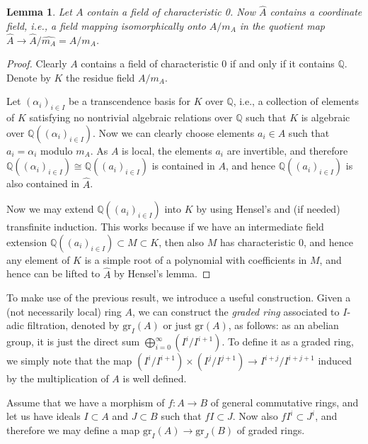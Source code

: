 \documentclass[12pt,a4paper,leqno]{article}
\newcommand{\Q}{\mathbb{Q}}
\newcommand{\gr}{\mathrm{gr}}
\theoremstyle{plain}
\newtheorem{lem}[theo]{Lemma}
\theoremstyle{definition}
\theoremstyle{remark}
\begin{document}
\begin{lem}
Let $A$ contain a field of characteristic 0. Now $\widehat A$ contains a coordinate field, i.e., a field mapping isomorphically onto $ A/ m_A$ in the quotient map $\widehat A \to \widehat A/ \widehat {m_A} = A / m_A$.
\end{lem}
\begin{proof}
Clearly $A$ contains a field of characteristic 0 if and only if it contains $\Q$. Denote by $K$ the residue field $A/m_A$. 

Let $(\alpha_i)_{i \in I}$ be a transcendence basis for $K$ over $\Q$, i.e., a collection of elements of $K$ satisfying no nontrivial algebraic relations over $\Q$ such that $K$ is algebraic over $\Q((\alpha_i)_{i \in I})$. Now we can clearly choose elements $a_i \in A$ such that $a_i = \alpha_i$ modulo $m_A$. As $A$ is local, the elements $a_i$ are invertible, and therefore $\Q((\alpha_i)_{i \in I}) \cong \Q((a_i)_{i \in I})$ is contained in $A$, and hence $\Q((a_i)_{i \in I})$ is also contained in $\widehat A$.

Now we may extend $\Q((a_i)_{i \in I})$ into $K$ by using Hensel's and (if needed) transfinite induction. This works because if we have an intermediate field extension $\Q((a_i)_{i \in I}) \subset M \subset K$, then also $M$ has characteristic $0$, and hence any element of $K$ is a simple root of a polynomial with coefficients in $M$, and hence can be lifted to $\widehat A$ by Hensel's lemma.
\end{proof}

To make use of the previous result, we introduce a useful construction. Given a (not necessarily local) ring $A$, we can construct the \emph{graded ring} associated to $I$-adic filtration, denoted by $\gr_I (A)$ or just $\gr (A)$, as follows: as an abelian group, it is just the direct sum $\bigoplus_{i=0}^\infty (I^i / I^{i+1})$. To define it as a graded ring, we simply note that the map $(I^i / I^{i+1}) \times (I^j / I^{j+1}) \to I^{i+j} / I^{i+j+1}$ induced by the multiplication of $A$ is well defined. 

Assume that we have a morphism of $f: A \to B$ of general commutative rings, and let us have ideals $I \subset A$ and $J \subset B$ such that $fI \subset J$. Now also $fI^i \subset J^i$, and therefore we may define a map $\gr_I (A) \to \gr_J (B)$ of graded rings.
\end{document}
